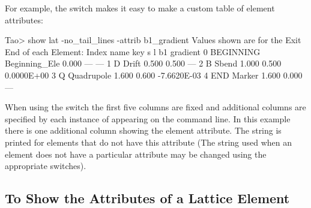 \documentclass{hitec}     %
\begin{document}
For example, the  switch makes it easy to make a custom table of element attributes:
\begin{code}  
Tao> show lat -no_tail_lines -attrib b1_gradient 
 Values shown are for the Exit End of each Element:
 Index  name      key                      s       l          b1
                                                        gradient
      0  BEGINNING Beginning_Ele        0.000     ---         ---
      1  D         Drift                0.500   0.500         ---
      2  B         Sbend                1.000   0.500  0.0000E+00
      3  Q         Quadrupole           1.600   0.600 -7.6620E-03
      4  END       Marker               1.600   0.000         ---
\end{code}
When using the  switch the first five columns are fixed and additional columns are
specified by each instance of  appearing on the command line. In this example there
is one additional column showing the  element attribute. The string \vn{---} is
printed for elements that do not have this attribute (The string used when an element does not have
a particular attribute may be changed using the appropriate  switches).

\newpage

\subsection{To Show the Attributes of a Lattice Element}
\end{document}
